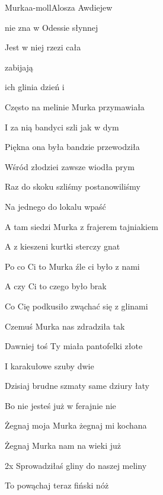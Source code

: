 \documentclass[a4paper,draft]{book}
\begin{document}
\begin{song}{Murka}{a-moll}{}{Alosza Awdiejew}{}{}
	\begin{SBVerse}
	 nie zna w Odessie  słynnej  

	Jest w niej rzezi cała 

	 zabijają  

	 ich glinia dzień i 
	\end{SBVerse}
 
	\begin{SBVerse}
	Często na melinie Murka przymawiała

	I za nią bandyci szli jak w dym

	Piękna ona była bandzie przewodziła

	Wśród złodziei zawsze wiodła prym
	\end{SBVerse}

	\begin{SBVerse}
	Raz do skoku szliśmy postanowiliśmy 

	Na jednego do lokalu wpaść

	A tam siedzi Murka z frajerem tajniakiem

	A z kieszeni kurtki sterczy gnat
	\end{SBVerse}
	 
	\begin{SBVerse}
	Po co Ci to Murka źle ci było z nami

	A czy Ci to czego było brak

	Co Cię podkusiło zwąchać się z glinami    

	Czemuś Murka nas zdradziła tak
	\end{SBVerse}
	 
	\begin{SBVerse}
	Dawniej toś Ty miała pantofelki złote

	I karakułowe szuby dwie

	Dzisiaj brudne szmaty same dziury łaty

	Bo nie jesteś już w ferajnie nie
	\end{SBVerse}
	 
	\begin{SBVerse}
	Żegnaj moja Murka żegnaj mi kochana

	Żegnaj Murka nam na wieki już
	\end{SBVerse}
	\begin{SBBracket}{2x}
	Sprowadziłaś gliny do naszej meliny

	To powąchaj teraz fiński nóż
	\end{SBBracket}

\end{song}
\end{document}
